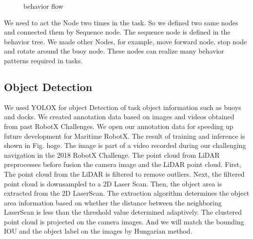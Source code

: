 \documentclass[lettersize,journal]{IEEEtran}
\begin{document}
\begin{figure}[htbp]
  \begin{center}
  \end{center}
  \caption{behavior flow}
  \label{fig:behavior_flow}
\end{figure}

We need to act the Node two times in the task. So we defined two same nodes and connected them by Sequence node. 
The sequence node is defined in the behavior tree.
We made other Nodes, for example, move forward node, stop node and rotate around the buoy node.
These nodes can realize many behavior patterns required in tasks.

\subsection{Object Detection}
We used  YOLOX\cite{YOLOX} for object Detection of task object information such as buoys and docks.
We created annotation data based on images and videos obtained from past RobotX Challenges.
We open our annotation data for speeding up future development for Maritime RobotX. \cite{dataset_annotations}
The result of training and inference is shown in Fig. hoge. 
The image is part of a video recorded during our challenging navigation in the 2018 RobotX Challenge.\cite{RobotX2018_video}
\indent The point cloud from LiDAR preprocesses before fusion the camera image and the LiDAR point cloud.
First, The point cloud from the LiDAR is filtered to remove outliers.
Next, the filtered point cloud is downsampled to a 2D Laser Scan.
Then, the object area is extracted from the 2D LaserScan. \cite{scan_segmentation}
The extraction algorithm determines the object area information based on whether the distance between 
the neighboring LaserScan is less than the threshold value determined adaptively.
The clustered point cloud is projected on the camera images.
And we will match the bounding IOU and the object label on the images by Hungarian method.
\end{document}
